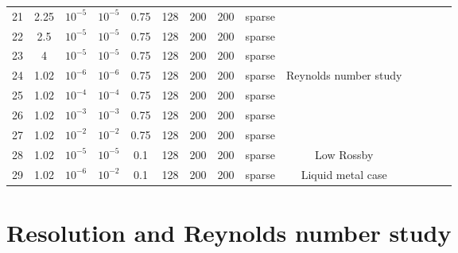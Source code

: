 \documentclass[aps,prl,preprint
,superscriptaddress]{revtex4-1}
\begin{document}
\begin{tabular}{cccccccccccccc}
21 & 2.25   & $10^{-5}$ & $10^{-5}$ & 0.75 & 128 & 200 & 200 & sparse & \\
22 & 2.5    & $10^{-5}$ & $10^{-5}$ & 0.75 & 128 & 200 & 200 & sparse & \\
23 & 4      & $10^{-5}$ & $10^{-5}$ & 0.75 & 128 & 200 & 200 & sparse & \\
24 & 1.02   & $10^{-6}$ & $10^{-6}$ & 0.75 & 128 & 200 & 200 & sparse & Reynolds number study\\
25 & 1.02   & $10^{-4}$ & $10^{-4}$ & 0.75 & 128 & 200 & 200 & sparse & \\
26 & 1.02   & $10^{-3}$ & $10^{-3}$ & 0.75 & 128 & 200 & 200 & sparse & \\
27 & 1.02   & $10^{-2}$ & $10^{-2}$ & 0.75 & 128 & 200 & 200 & sparse & \\
28 & 1.02   & $10^{-5}$ & $10^{-5}$ & 0.1  & 128 & 200 & 200 & sparse & Low Rossby\\ 
29 & 1.02   & $10^{-6}$ & $10^{-2}$ & 0.1  & 128 & 200 & 200 & sparse & Liquid metal case\\ 
\end{tabular}



\section{Resolution and Reynolds number study}
\label{sec:resolution}
\end{document}
